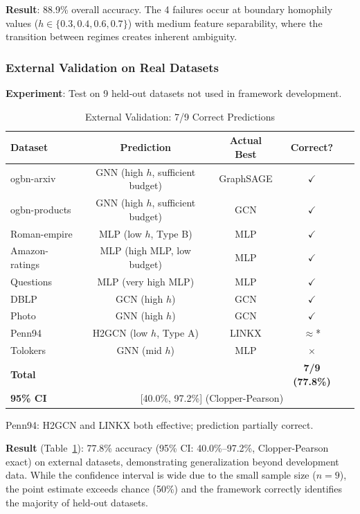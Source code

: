 \textbf{Result}: 88.9\% overall accuracy. The 4 failures occur at boundary homophily values ($h \in \{0.3, 0.4, 0.6, 0.7\}$) with medium feature separability, where the transition between regimes creates inherent ambiguity.

\subsubsection{External Validation on Real Datasets}

\textbf{Experiment}: Test on 9 held-out datasets not used in framework development.

\begin{table}[t]
\centering
\caption{External Validation: 7/9 Correct Predictions}
\label{tab:external_validation}
\begin{tabular}{@{}lcccc@{}}
\toprule
\textbf{Dataset} & \textbf{Prediction} & \textbf{Actual Best} & \textbf{Correct?} \\
\midrule
ogbn-arxiv & GNN (high $h$, sufficient budget) & GraphSAGE & $\checkmark$ \\
ogbn-products & GNN (high $h$, sufficient budget) & GCN & $\checkmark$ \\
Roman-empire & MLP (low $h$, Type B) & MLP & $\checkmark$ \\
Amazon-ratings & MLP (high MLP, low budget) & MLP & $\checkmark$ \\
Questions & MLP (very high MLP) & MLP & $\checkmark$ \\
DBLP & GCN (high $h$) & GCN & $\checkmark$ \\
Photo & GNN (high $h$) & GCN & $\checkmark$ \\
\midrule
Penn94 & H2GCN (low $h$, Type A) & LINKX & $\approx$* \\
Tolokers & GNN (mid $h$) & MLP & $\times$ \\
\midrule
\textbf{Total} & & & \textbf{7/9 (77.8\%)} \\
\textbf{95\% CI} & \multicolumn{3}{c}{[40.0\%, 97.2\%] (Clopper-Pearson)} \\
\bottomrule
\end{tabular}
\vspace{1mm}
\raggedright\small *Penn94: H2GCN and LINKX both effective; prediction partially correct.
\end{table}

\textbf{Result} (Table~\ref{tab:external_validation}): 77.8\% accuracy (95\% CI: 40.0\%--97.2\%, Clopper-Pearson exact) on external datasets, demonstrating generalization beyond development data. While the confidence interval is wide due to the small sample size ($n=9$), the point estimate exceeds chance (50\%) and the framework correctly identifies the majority of held-out datasets.

